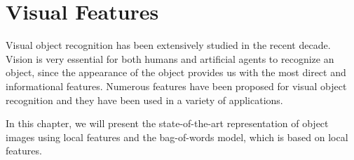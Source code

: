 \documentclass[12pt,final,twoside]{report}
\theoremstyle{plain}
\theoremstyle{definition}
\theoremstyle{remark}
\begin{document}
\chapter{Visual Features}
\label{ch:visual}

Visual object recognition has been extensively studied in the recent decade. Vision is very essential for both humans and artificial agents to recognize an object, since the appearance of the object provides us with the most direct and informational features. Numerous features have been proposed for visual object recognition and they have been used in a variety of applications.

In this chapter, we will present the state-of-the-art representation of object images using local features and the bag-of-words model, which is based on local features.
\end{document}

